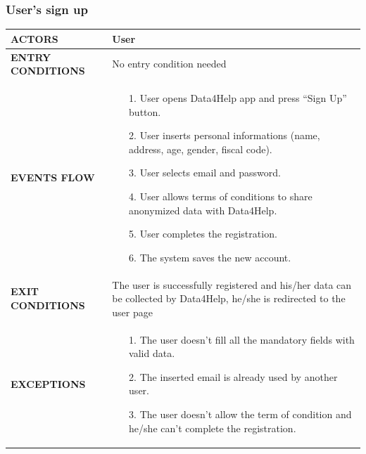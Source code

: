 \documentclass[a4paper]{article}
\begin{document}
    \subsubsection{User's sign up}
    \begin{center}
        \begin{tabular}{ l || p{8cm} ||}
            \bf{ACTORS} & User \\ 
            \hline
            \bf{ENTRY CONDITIONS} & No entry condition needed  \\ 
            \hline
            \bf{EVENTS FLOW} & \begin{itemize}[noitemsep, topsep=0cm, leftmargin=*] \vspace{-0.2cm}
                \item[1.] User opens Data4Help app and press “Sign Up” button.
                \item[2.] User inserts personal informations (name, address, age, gender, fiscal code).
                \item[3.] User selects email and password.
                \item[4.] User allows terms of conditions to share anonymized data with Data4Help.
                \item[5.] User completes the registration.
                \item[6.] The system saves the new account.
            \end{itemize}\\ 
            \hline
            \bf{EXIT CONDITIONS} & The user is successfully registered and his/her data can be collected by Data4Help, he/she is redirected to the user page\\ \hline
            \bf{EXCEPTIONS} & \begin{itemize}[noitemsep, topsep=0cm, leftmargin=*] \vspace{-0.2cm}
                \item[1.] The user doesn’t fill all the mandatory fields with valid data.
                \item[2.]The inserted email is already used by another user.
                \item[3.] The user doesn’t allow the term of condition and he/she can’t complete the registration.
            \end{itemize}
            \\ \hline \hline
        \end{tabular}
    \end{center}
    
\end{document}
